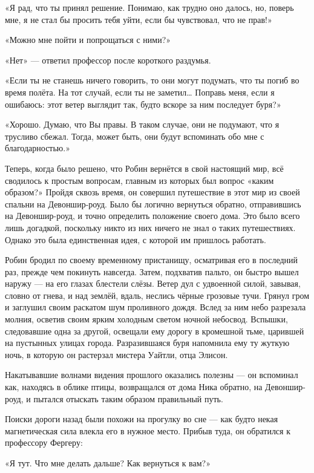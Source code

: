 \documentclass[a5paper, 9pt,
final, openany, twoside=true]{memoir}
\begin{document}
«Я рад, что ты принял решение. Понимаю, как трудно оно далось, но, поверь мне, я не стал бы просить тебя уйти, если бы чувствовал, что не прав!»

«Можно мне пойти и попрощаться с ними?»

«Нет» — ответил профессор после короткого раздумья.

«Если ты не станешь ничего говорить, то они могут подумать, что ты погиб во время полёта. На тот случай, если ты не заметил… Поправь меня, если я ошибаюсь: этот ветер выглядит так, будто вскоре за ним последует буря?»

«Хорошо. Думаю, что Вы правы. В таком случае, они не подумают, что я трусливо сбежал. Тогда, может быть, они будут вспоминать обо мне с благодарностью.»\bigskip

Теперь, когда было решено, что Робин вернётся в свой настоящий мир, всё сводилось к простым вопросам, главным из которых был вопрос «каким образом?» Пройдя сквозь время, он совершил путешествие в этот мир из своей спальни на Девоншир-роуд. Было бы логично вернуться обратно, отправившись на Девоншир-роуд, и точно определить положение своего дома. Это было всего лишь догадкой, поскольку никто из них ничего не знал о таких путешествиях. Однако это была единственная идея, с которой им пришлось работать.

Робин бродил по своему временному пристанищу, осматривая его в последний раз, прежде чем покинуть навсегда. Затем, подхватив пальто, он быстро вышел наружу — на его глазах блестели слёзы. Ветер дул с удвоенной силой, завывая, словно от гнева, и над землёй, вдаль, неслись чёрные грозовые тучи. Грянул гром и заглушил своим раскатом шум проливного дождя. Вслед за ним небо разрезала молния, осветив своим ярким холодным светом ночной небосвод. Вспышки, следовавшие одна за другой, освещали ему дорогу в кромешной тьме, царившей на пустынных улицах города. Разразившаяся буря напомнила ему ту жуткую ночь, в которую он растерзал мистера Уайтли, отца Элисон.

Накатывавшие волнами видения прошлого оказались полезны — он вспоминал как, находясь в облике птицы, возвращался от дома Ника обратно, на Девоншир-роуд, и пытался отыскать таким образом правильный путь.

Поиски дороги назад были похожи на прогулку во сне — как будто некая магнетическая сила влекла его в нужное место. Прибыв туда, он обратился к профессору Фергеру:

«Я тут. Что мне делать дальше? Как вернуться к вам?»
\end{document}
